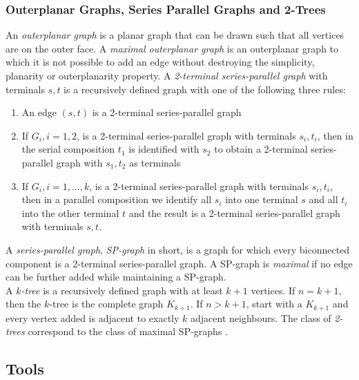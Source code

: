 \subsubsection{Outerplanar Graphs, Series Parallel Graphs and 2-Trees}
An \emph{outerplanar graph} is a planar graph that can be drawn such that all vertices are on the outer face. A \emph{maximal outerplanar graph} is an outerplanar graph to which it is not possible to add an edge without destroying the simplicity, planarity or outerplanarity property. 
A \emph{2-terminal series-parallel graph} with terminals $s,t$ is a recursively defined graph with one of the following three rules:
\begin{enumerate}
	\item An edge $(s,t)$ is a 2-terminal series-parallel graph
	\item If $G_i, i = 1,2$, is a 2-terminal series-parallel graph with terminals $s_i,t_i$, then in the serial composition $t_1$ is identified with $s_2$ to obtain a 2-terminal series-parallel graph with $s_1,t_2$ as terminals
	\item If $G_i, i=1,...,k$, is a 2-terminal series-parallel graph with terminals $s_i,t_i$, then in a parallel composition we identify all $s_i$ into one terminal $s$ and all $t_i$ into the other terminal $t$ and the result is a 2-terminal series-parallel graph with terminals $s,t$.
\end{enumerate}
A \emph{series-parallel graph}, \emph{SP-graph} in short, is a graph for which every biconnected component is a 2-terminal series-parallel graph. A SP-graph is \emph{maximal} if no edge can be further added while maintaining a SP-graph. \cite[P. 143ff]{Biedl_SP}\\
A \emph{$k$-tree} is a recursively defined graph with at least $k+1$ vertices. If $n = k+1$, then the $k$-tree is the complete graph $K_{k+1}$. If $n>{k+1}$, start with a $K_{k+1}$ and every vertex added is adjacent to exactly $k$ adjacent neighbours. The class of \emph{2-trees} correspond to the class of maximal SP-graphs \cite[Page 2]{straight-line_2-trees}.
\subsection{Tools}
